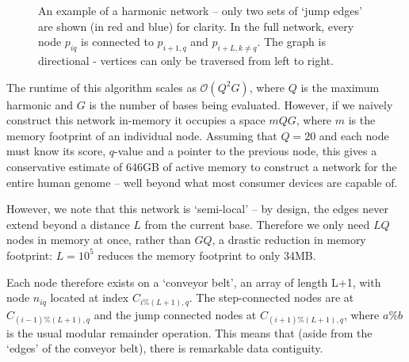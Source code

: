 \documentclass[fleqn,usenatbib]{mnras}
\begin{document}
\begin{figure}
\begin{center}
{
						}
						\caption{An example of a harmonic network -- only two sets of `jump edges' are shown (in red and blue) for clarity. In the full network, every node $p_{iq}$ is connected to $p_{i+1,q}$ and $p_{i+L,k\neq q}$. The graph is directional - vertices can only be traversed from left to right.}\label{F:Network}
					\end{center}
				\end{figure}

				The runtime of this algorithm scales as $\mathcal{O}(Q^2 G)$, where $Q$ is the maximum harmonic and $G$ is the number of bases being evaluated. However, if we naively construct this network in-memory it occupies a space $m Q G$, where $m$ is the memory footprint of an individual node. Assuming that $Q = 20$ and each node must know its score, $q$-value and a pointer to the previous node, this gives a conservative estimate of 646GB of active memory to construct a network for the entire human genome -- well beyond what most consumer devices are capable of. 

				However, we note that this network is `semi-local' -- by design, the edges never extend beyond a distance $L$ from the current base. Therefore we only need $LQ$ nodes in memory at once, rather than $GQ$, a drastic reduction in memory footprint: $L = 10^5$ reduces the memory footprint to only 34MB.

				Each node therefore exists on a `conveyor belt', an array of length L+1, with node $n_{iq}$ located at index $C_{i \% (L+1),q}$. The step-connected nodes are at $C_{(i-1)\% (L+1),q}$ and the jump connected nodes at $C_{(i+1) \% (L+1),q}$, where $a\%b$ is the usual modular remainder operation. This means that (aside from the `edges' of the conveyor belt), there is remarkable data contiguity.
\end{document}
